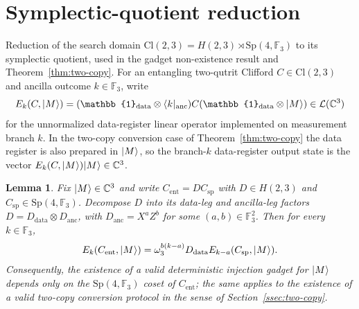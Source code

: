 \documentclass[11pt]{article}
\newtheorem{lemma}[theorem]{Lemma}
\theoremstyle{definition}
\newcommand{\microspace}{\mspace{0.5mu}}
\newcommand{\ket}[1]{\lvert\microspace #1 \microspace \rangle}
\newcommand{\bra}[1]{\langle\microspace #1 \microspace \rvert}
\newcommand{\I}{\mathbb{1}}
\newcommand{\complex}{\mathbb{C}}
\newcommand{\F}{\mathcal{F}}
\renewcommand{\L}{\mathcal{L}}
\renewcommand{\F}[1]{\mathbb{F}_{#1}}
\newcommand{\Sp}{\mathrm{Sp}}
\newcommand{\Cl}{\mathrm{Cl}}
\begin{document}
	
	
	
	\appendix
	\section{Symplectic-quotient reduction}\label{app:gadget-reduction}

	Reduction of the search domain
	$\Cl(2, 3) = H(2, 3) \rtimes \Sp(4, \F{3})$ to its symplectic
	quotient, used in the gadget non-existence result and
	Theorem~\ref{thm:two-copy}. For an entangling two-qutrit Clifford
	$C \in \Cl(2, 3)$ and ancilla outcome $k \in \F{3}$, write
	\begin{equation}\label{eq:Ek-def}
		E_k(C, \ket M) =
		(\I_{\mathrm{data}} \otimes \bra{k}_{\mathrm{anc}}) C		(\I_{\mathrm{data}} \otimes \ket{M})
		\in \L(\complex^3)
	\end{equation}
	for the unnormalized data-register linear operator implemented on
	measurement branch $k$. In the two-copy conversion case of
	Theorem~\ref{thm:two-copy} the data register is also prepared in
	$\ket M$, so the branch-$k$ data-register output state is the
	vector $E_k(C, \ket M) \ket M \in \complex^3$.

	\begin{lemma}\label{lem:gadget-reduction}
		Fix $\ket{M} \in \complex^3$ and write $C_{\mathrm{ent}} =
		D C_{\mathrm{sp}}$ with $D \in H(2, 3)$ and $C_{\mathrm{sp}} \in
		\Sp(4, \F{3})$. Decompose $D$ into its data-leg and ancilla-leg
		factors $D = D_{\mathrm{data}} \otimes D_{\mathrm{anc}}$, with
		$D_{\mathrm{anc}} = X^{a} Z^{b}$ for some $(a, b) \in \F{3}^2$.
		Then for every $k \in \F{3}$,
		\begin{equation}\label{eq:gadget-reduction}
			E_k(C_{\mathrm{ent}}, \ket{M})
			= \omega_3^{b(k - a)} D_{\mathrm{data}} E_{k - a}(C_{\mathrm{sp}}, \ket{M}).
		\end{equation}
		Consequently, the existence of a valid deterministic injection
		gadget for $\ket{M}$ depends only on the $\Sp(4, \F{3})$ coset of
		$C_{\mathrm{ent}}$; the same applies to the existence of a valid
		two-copy conversion protocol in the sense of
		Section~\ref{ssec:two-copy}.
	\end{lemma}
\end{document}
